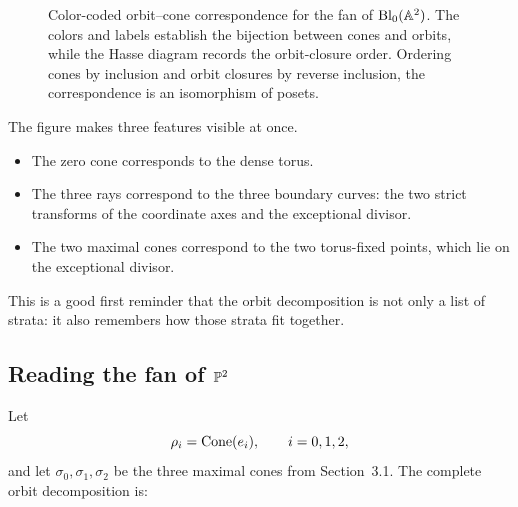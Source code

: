 \begin{figure}[ht]
\caption{Color-coded orbit--cone correspondence for the fan of
\(\operatorname{Bl}_0(\mathbb{A}^2)\). The colors and labels establish the bijection
between cones and orbits, while the Hasse diagram records the
orbit-closure order. Ordering cones by inclusion and orbit closures by
reverse inclusion, the correspondence is an isomorphism of posets.}
\label{fig:blowup-orbit-cone-bijection}
\end{figure}

The figure makes three features visible at once.

\begin{itemize}
\item The zero cone corresponds to the dense torus.
\item The three rays correspond to the three boundary curves: the two
strict transforms of the coordinate axes and the exceptional divisor.
\item The two maximal cones correspond to the two torus-fixed points,
which lie on the exceptional divisor.
\end{itemize}

This is a good first reminder that the orbit decomposition is not only
a list of strata: it also remembers how those strata fit together.

\subsection{Reading the fan of \texorpdfstring{\(\mathbb{P}^2\)}{P2}}

Let
\[
\rho_i=\operatorname{Cone}(e_i),
\qquad
i=0,1,2,
\]
and let \(\sigma_0,\sigma_1,\sigma_2\) be the three maximal cones from
Section~3.1. The complete orbit decomposition is:

